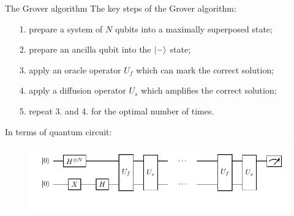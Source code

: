 \documentclass[aspectratio=169, 8pt, xcolor={svgnames}, hyperref={linkcolor=black}]{beamer}
\begin{document}
\begin{frame}{The Grover algorithm}
The key steps of the Grover algorithm:

\begin{itemize}[noitemsep]
\item[1.] prepare a system of $N$ qubits into a maximally superposed state;
\item[2.] prepare an ancilla qubit into the $\ket{-}$ state;
\item[3.] apply an oracle operator $U_f$ which can mark the correct solution;
\item[4.] apply a diffusion operator $U_s$ which amplifies the correct solution;
\item[5.] repeat 3. and 4. for the optimal number of times.
\end{itemize}
\pause

In terms of quantum circuit:
\begin{figure}
    \includegraphics[width=.9\textwidth]{figures/grover-circ.pdf}
\end{figure}
\end{frame}
\end{document}
